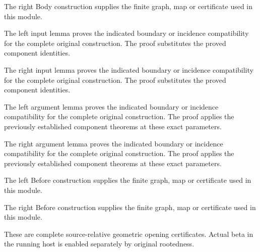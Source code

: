 The right Body construction supplies the finite graph, map or certificate used in this module.
\par{}

The left input lemma proves the indicated boundary or incidence compatibility for the complete original construction.
The proof substitutes the proved component identities.
\par{}

The right input lemma proves the indicated boundary or incidence compatibility for the complete original construction.
The proof substitutes the proved component identities.
\par{}

The left argument lemma proves the indicated boundary or incidence compatibility for the complete original construction.
The proof applies the previously established component theorems at these exact parameters.
\par{}

The right argument lemma proves the indicated boundary or incidence compatibility for the complete original construction.
The proof applies the previously established component theorems at these exact parameters.
\par{}

The left Before construction supplies the finite graph, map or certificate used in this module.
\par{}

The right Before construction supplies the finite graph, map or certificate used in this module.
\par{}

These are complete source-relative geometric opening certificates.
Actual beta in the running host is enabled separately by original rootedness.
\par{}

